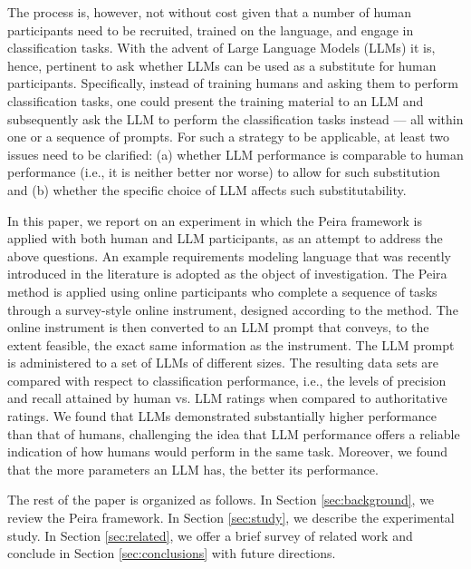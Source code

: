 The process is, however, not without cost given that a number of human participants need to be recruited, trained on the language, and engage in classification tasks. With the advent of Large Language Models (LLMs) \cite{LLM.survey} it is, hence, pertinent to ask whether LLMs can be used as a substitute for human participants. Specifically, instead of training humans and asking them to perform classification tasks, one could present the training material to an LLM and subsequently ask the LLM to perform the classification tasks instead --- all within one or a sequence of prompts. For such a strategy to be applicable, at least two issues need to be clarified: (a) whether LLM performance is comparable to human performance (i.e., it is neither better nor worse) to allow for such substitution and (b) whether the specific choice of LLM affects such substitutability. 

In this paper, we report on an experiment in which the Peira framework is applied with both human and LLM participants, as an attempt to address the above questions. 
An example requirements modeling language that was recently introduced in the literature is adopted as the object of investigation. The Peira method is applied using online participants who complete a sequence of tasks through a survey-style online instrument, designed according to the method. The online instrument is then converted to an LLM prompt that conveys, to the extent feasible, the exact same information as the instrument. The LLM prompt is administered to a set of LLMs of different sizes. The resulting data sets are compared with respect to classification performance, i.e., the levels of precision and recall attained by human vs. LLM ratings when compared to authoritative ratings. We found that LLMs demonstrated substantially higher performance than that of humans, challenging the idea that LLM performance offers a reliable indication of how humans would perform in the same task. Moreover, we found that the more parameters an LLM has, the better its performance.

The rest of the paper is organized as follows. In Section \ref{sec:background}, we review the Peira framework. In Section \ref{sec:study}, we describe the experimental study. In Section \ref{sec:related}, we offer a brief survey of related work and conclude in Section \ref{sec:conclusions} with future directions.

